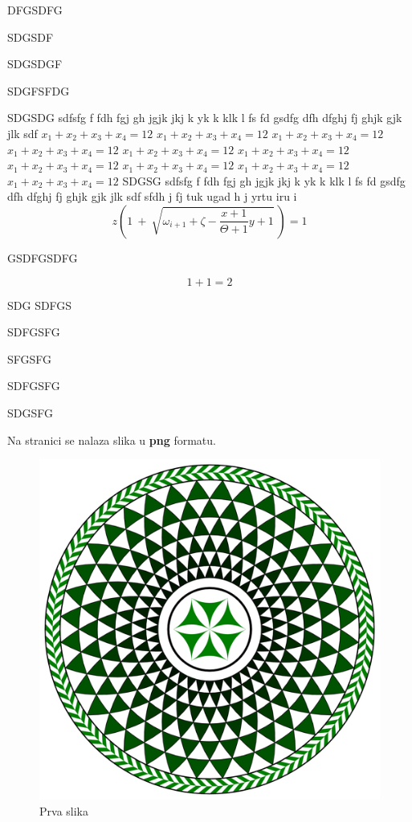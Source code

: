 \documentclass[a4paper,twoside,12pt]{memoir} %
\begin{document}
DFGSDFG


SDGSDF


SDGSDGF


SDGFSFDG


SDGSDG  sdfsfg f fdh fgj gh jgjk jkj k yk k klk l fs fd gsdfg dfh dfghj fj ghjk gjk jlk sdf 
$x_1+x_2+x_3+x_4=12$ $x_1+x_2+x_3+x_4=12$
 $x_1+x_2+x_3+x_4=12$ $x_1+x_2+x_3+x_4=12$ $x_1+x_2+x_3+x_4=12$ $x_1+x_2+x_3+x_4=12$
 $x_1+x_2+x_3+x_4=12$ $x_1+x_2+x_3+x_4=12$ $x_1+x_2+x_3+x_4=12$
$x_1+x_2+x_3+x_4=12$ 
SDGSG sdfsfg f fdh fgj gh jgjk jkj k yk k klk l fs fd gsdfg dfh dfghj fj ghjk gjk jlk sdf sfdh j fj tuk ugad h j yrtu iru i
\[ z \left( 1 \ +\ \sqrt{\omega_{i+1} + \zeta -\frac{x+1}{\Theta +1} y + 1}
\ \right) =  1 \]

GSDFGSDFG



\begin{equation}
\label{eq:jed111}
	1+1=2
\end{equation}

SDG
SDFGS

SDFGSFG


SFGSFG


SDFGSFG


SDGSFG

\label{stranica}
Na stranici \pageref{stranica} se nalaza slika u \textbf{png} formatu.
\begin{figure}[h!t]
\begin{center}
\includegraphics[scale=0.5]{mosaic-from-pompeii.png}
\caption{Prva slika}
\end{center}
\end{figure}
\end{document}
